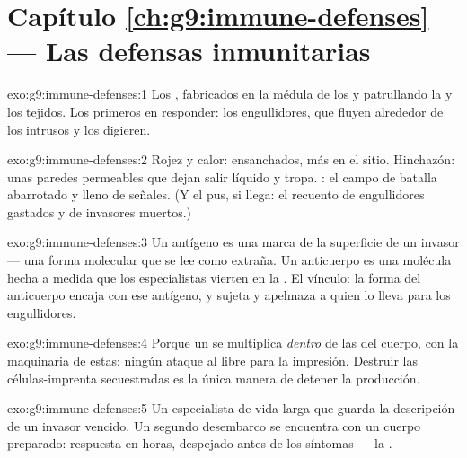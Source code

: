 \section*{Capítulo \ref{ch:g9:immune-defenses} --- Las defensas inmunitarias}

\begin{solution}{exo:g9:immune-defenses:1}
Los , fabricados en la médula de los  y
patrullando la  y los tejidos. Los primeros en responder: los
engullidores, que fluyen alrededor de los intrusos y los digieren.
\end{solution}

\begin{solution}{exo:g9:immune-defenses:2}
Rojez y calor:  ensanchados, más  en el sitio. Hinchazón:
unas paredes permeables que dejan salir líquido y tropa. : el
campo de batalla abarrotado y lleno de señales. (Y el pus, si llega: el
recuento de engullidores gastados y de invasores muertos.)
\end{solution}

\begin{solution}{exo:g9:immune-defenses:3}
Un antígeno es una marca de la superficie de un invasor --- una forma
molecular que se lee como extraña. Un anticuerpo es una molécula hecha
a medida que los especialistas vierten en la . El vínculo: la
forma del anticuerpo encaja con ese antígeno, y sujeta y apelmaza a
quien lo lleva para los engullidores.
\end{solution}

\begin{solution}{exo:g9:immune-defenses:4}
Porque un  se multiplica \emph{dentro} de las  del cuerpo,
con la maquinaria de estas: ningún ataque al  libre para la
impresión. Destruir las células-imprenta secuestradas es la única
manera de detener la producción.
\end{solution}

\begin{solution}{exo:g9:immune-defenses:5}
Un especialista de vida larga que guarda la descripción de un invasor
vencido. Un segundo desembarco se encuentra con un cuerpo preparado:
respuesta en horas, despejado antes de los síntomas --- la .
\end{solution}

